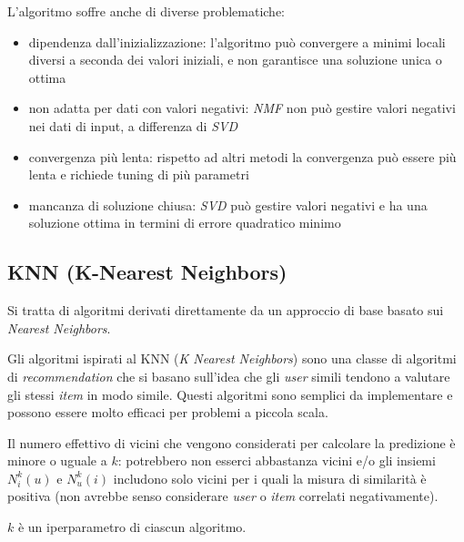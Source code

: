 L'algoritmo soffre anche di diverse problematiche:

\begin{itemize}
    \item dipendenza dall'inizializzazione: l'algoritmo può convergere a minimi locali diversi a seconda dei valori iniziali, e non garantisce una soluzione unica o ottima
    
    \item non adatta per dati con valori negativi: \textit{NMF} non può gestire valori negativi nei dati di input, a differenza di \textit{SVD}
    \item convergenza più lenta: rispetto ad altri metodi la convergenza può essere più lenta e richiede tuning di più parametri
    \item mancanza di soluzione chiusa: \textit{SVD} può gestire valori negativi e ha una soluzione ottima in termini di errore quadratico minimo
\end{itemize}

\subsection{KNN (K-Nearest Neighbors)}\label{knn}
Si tratta di algoritmi derivati direttamente da un approccio di base basato sui \textit{Nearest Neighbors}.

Gli algoritmi ispirati al KNN (\textit{K Nearest Neighbors}) sono una classe di algoritmi di \textit{recommendation} che si basano sull'idea che gli \textit{user} simili tendono a valutare gli stessi \textit{item} in modo simile. Questi algoritmi sono semplici da implementare e possono essere molto efficaci per problemi a piccola scala.

Il numero effettivo di vicini che vengono considerati per calcolare la predizione è minore o uguale a $k$: potrebbero non esserci abbastanza vicini e/o gli insiemi $N_i^k(u)$ e $N_u^k(i)$ includono solo vicini per i quali la misura di similarità è positiva (non avrebbe senso considerare \textit{user} o \textit{item} correlati negativamente).

$k$ è un iperparametro di ciascun algoritmo.

